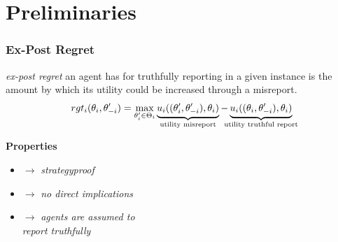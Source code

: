 \documentclass{beamer}
\begin{document}
	\section{Preliminaries}
	\begin{frame}
		\frametitle{Ex-Post Regret}
		\emph{ex-post regret} an agent has for truthfully reporting in a given instance is the amount by which its utility could be increased through a misreport. 
		\begin{equation*}
		rgt_{i}(\theta_{i},\theta'_{-i}) = \max\limits_{\theta'_{i} \in \Theta_{i}} 
		\underbrace{u_{i}((\theta'_{i}, \theta'_{-i}), \theta_{i})}_{\mathclap{\text{utility misreport}}}
		- \underbrace{u_{i}((\theta_{i}, \theta'_{-i}), \theta_{i})}_{\mathclap{\text{utility truthful report}}}
		\end{equation*}
		
		
		\medskip
		\pause\textbf{Properties}
		\begin{itemize}
			\pause\item {} $\rightarrow $ \emph{strategyproof}
			\pause\item {} $\rightarrow $ \emph{no direct implications}
			\pause\item {} $\rightarrow $ \emph{agents are assumed to \\ \makebox[6.5cm]{\hfill}\qquad report truthfully}
		\end{itemize}
	\end{frame}
	
\end{document}
